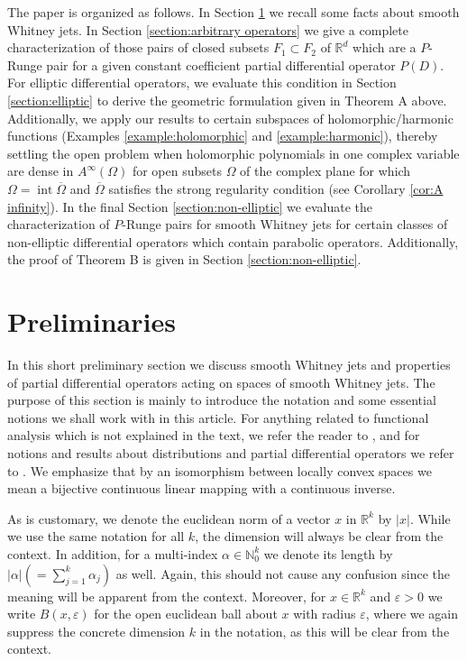\documentclass[10pt,leqno]{amsart}
\theoremstyle{definition}
\newcommand{\R}{\mathbb R}
\newcommand{\N}{\mathbb N}
\begin{document}
The paper is organized as follows. In Section \ref{section:preliminaries} we recall some facts about smooth Whitney jets. In Section \ref{section:arbitrary operators} we give a complete characterization of those pairs of closed subsets $F_1\subset F_2$ of $\R^d$ which are a $P$-Runge pair for a given constant coefficient partial differential operator $P(D)$. For elliptic differential operators, we evaluate this condition in Section \ref{section:elliptic} to derive the geometric formulation given in Theorem A above. Additionally, we apply our results to certain subspaces of holomorphic/harmonic functions (Examples \ref{example:holomorphic} and \ref{example:harmonic}), thereby settling the open problem \cite[Introduction]{GaNe16} when holomorphic polynomials in one complex variable are dense in $A^\infty(\Omega)$ for open subsets $\Omega$ of the complex plane for which $\Omega=\operatorname{int}\overline{\Omega}$ and $\overline{\Omega}$ satisfies the strong regularity condition (see Corollary \ref{cor:A infinity}). In the final Section \ref{section:non-elliptic} we evaluate the characterization of $P$-Runge pairs for smooth Whitney jets for certain classes of non-elliptic differential operators which contain parabolic operators. Additionally, the proof of Theorem B is given in Section \ref{section:non-elliptic}.

\section{Preliminaries}\label{section:preliminaries}

In this short preliminary section we discuss smooth Whitney jets and properties of partial differential operators acting on spaces of smooth Whitney jets. The purpose of this section is mainly to introduce the notation and some essential notions we shall work with in this article. For anything related to functional analysis which is not explained in the text, we refer the reader to \cite{MeV}, and for notions and results about distributions and partial differential operators we refer to \cite{Hor1, Hor2}. We emphasize that by an isomorphism between locally convex spaces we mean a bijective continuous linear mapping with a continuous inverse.

As is customary, we denote the euclidean norm of a vector $x$ in $\R^k$ by $|x|$. While we use the same notation for all $k$, the dimension will always be clear from the context. In addition, for a multi-index $\alpha\in\N_0^k$ we denote its length by $|\alpha|(=\sum_{j=1}^k \alpha_j)$ as well. Again, this should not cause any confusion since the meaning will be apparent from the context. Moreover, for $x\in \R^k$ and $\varepsilon>0$ we write $B(x,\varepsilon)$ for the open euclidean ball about $x$ with radius $\varepsilon$, where we again suppress the concrete dimension $k$ in the notation, as this will be clear from the context.
\end{document}
